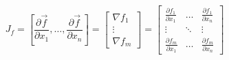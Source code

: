         \begin{equation} \label{eq:jacobian}
            J_f=\left[\frac{\partial \vec{f}}{\partial x_1},\dots,\frac{\partial \vec{f}}{\partial x_n}\right]=\begin{bmatrix}\nabla f_1\\\vdots\\\nabla f_m\end{bmatrix}=\begin{bmatrix}
                \frac{\partial f_1}{\partial x_1} & \dots & \frac{\partial f_1}{\partial x_n}\\
                \vdots & \ddots & \vdots\\
                \frac{\partial f_m}{\partial x_1} & \dots & \frac{\partial f_m}{\partial x_n}
            \end{bmatrix}
        \end{equation}


